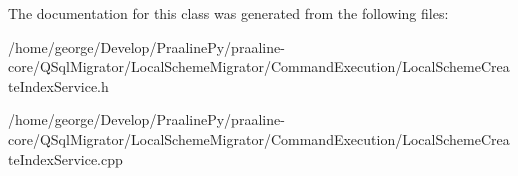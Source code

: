 The documentation for this class was generated from the following files\+:\begin{DoxyCompactItemize}
\item 
/home/george/\+Develop/\+Praaline\+Py/praaline-\/core/\+Q\+Sql\+Migrator/\+Local\+Scheme\+Migrator/\+Command\+Execution/Local\+Scheme\+Create\+Index\+Service.\+h\item 
/home/george/\+Develop/\+Praaline\+Py/praaline-\/core/\+Q\+Sql\+Migrator/\+Local\+Scheme\+Migrator/\+Command\+Execution/Local\+Scheme\+Create\+Index\+Service.\+cpp\end{DoxyCompactItemize}
